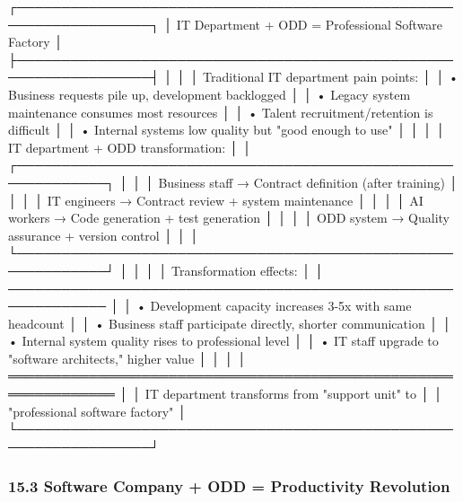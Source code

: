 \documentclass[
]{article}
\newenvironment{Shaded}{}{}
\newcommand{\NormalTok}[1]{#1}
\begin{document}
\begin{Shaded}
\begin{Highlighting}[]
\NormalTok{┌─────────────────────────────────────────────────────────────────┐}
\NormalTok{│        IT Department + ODD = Professional Software Factory       │}
\NormalTok{├─────────────────────────────────────────────────────────────────┤}
\NormalTok{│                                                                  │}
\NormalTok{│  Traditional IT department pain points:                         │}
\NormalTok{│  • Business requests pile up, development backlogged            │}
\NormalTok{│  • Legacy system maintenance consumes most resources            │}
\NormalTok{│  • Talent recruitment/retention is difficult                    │}
\NormalTok{│  • Internal systems low quality but "good enough to use"        │}
\NormalTok{│                                                                  │}
\NormalTok{│  IT department + ODD transformation:                            │}
\NormalTok{│  ┌────────────────────────────────────────────────────────────┐ │}
\NormalTok{│  │  Business staff → Contract definition (after training)     │ │}
\NormalTok{│  │  IT engineers  → Contract review + system maintenance      │ │}
\NormalTok{│  │  AI workers    → Code generation + test generation         │ │}
\NormalTok{│  │  ODD system    → Quality assurance + version control       │ │}
\NormalTok{│  └────────────────────────────────────────────────────────────┘ │}
\NormalTok{│                                                                  │}
\NormalTok{│  Transformation effects:                                        │}
\NormalTok{│  ─────────────────────────────────────────────────────────────  │}
\NormalTok{│  • Development capacity increases 3{-}5x with same headcount      │}
\NormalTok{│  • Business staff participate directly, shorter communication  │}
\NormalTok{│  • Internal system quality rises to professional level          │}
\NormalTok{│  • IT staff upgrade to "software architects," higher value      │}
\NormalTok{│                                                                  │}
\NormalTok{│  ══════════════════════════════════════════════════════════════  │}
\NormalTok{│  IT department transforms from "support unit" to                │}
\NormalTok{│  "professional software factory"                                │}
\NormalTok{└─────────────────────────────────────────────────────────────────┘}
\end{Highlighting}
\end{Shaded}

\hypertarget{153-software-company-+-odd-=-productivity-revolution}{%
\subsubsection{15.3 Software Company + ODD = Productivity
Revolution}\label{153-software-company-+-odd-=-productivity-revolution}}
\end{document}
